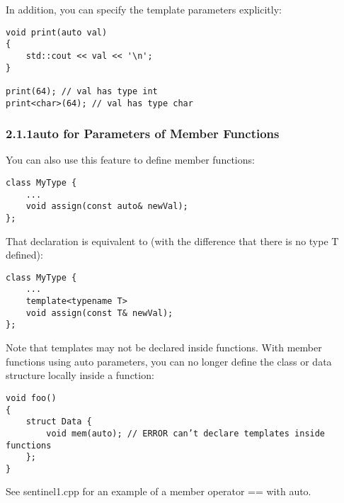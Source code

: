 In addition, you can specify the template parameters explicitly:

\begin{lstlisting}[style=styleCXX]
void print(auto val)
{
	std::cout << val << '\n';
}

print(64); // val has type int
print<char>(64); // val has type char
\end{lstlisting}


\subsubsection*{ 2.1.1\hspace{0.2cm}auto for Parameters of Member Functions}

You can also use this feature to define member functions:

\begin{lstlisting}[style=styleCXX]
class MyType {
	...
	void assign(const auto& newVal);
};
\end{lstlisting}

That declaration is equivalent to (with the difference that there is no type T defined):

\begin{lstlisting}[style=styleCXX]
class MyType {
	...
	template<typename T>
	void assign(const T& newVal);
};
\end{lstlisting}

Note that templates may not be declared inside functions. With member functions using auto parameters, you can no longer define the class or data structure locally inside a function:

\begin{lstlisting}[style=styleCXX]
void foo()
{
	struct Data {
		void mem(auto); // ERROR can’t declare templates inside functions
	};
}
\end{lstlisting}

See sentinel1.cpp for an example of a member operator == with auto.
